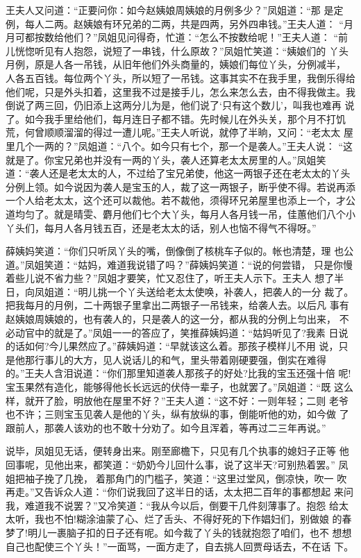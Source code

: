 王夫人又问道：“正要问你：如今赵姨娘周姨娘的月例多少？”凤姐道：“那
是定例，每人二两。赵姨娘有环兄弟的二两，共是四两，另外四串钱。”王夫人道：
“月月可都按数给他们？”凤姐见问得奇，忙道：“怎么不按数给呢！”王夫人道：
“前儿恍惚听见有人抱怨，说短了一串钱，什么原故？”凤姐忙笑道：“姨娘们的
丫头月例，原是人各一吊钱，从旧年他们外头商量的，姨娘们每位丫头，分例减半，
人各五百钱。每位两个丫头，所以短了一吊钱。这事其实不在我手里，我倒乐得给
他们呢，只是外头扣着，这里我不过是接手儿，怎么来怎么去，由不得我做主。我
倒说了两三回，仍旧添上这两分儿为是，他们说了‘只有这个数儿’，叫我也难再
说了。如今我手里给他们，每月连日子都不错。先时候儿在外头关，那个月不打饥
荒，何曾顺顺溜溜的得过一遭儿呢。”王夫人听说，就停了半晌，又问：“老太太
屋里几个一两的？”凤姐道：“八个。如今只有七个，那一个是袭人。”王夫人说：
“这就是了。你宝兄弟也并没有一两的丫头，袭人还算老太太房里的人。”凤姐笑
道：“袭人还是老太太的人，不过给了宝兄弟使，他这一两银子还在老太太的丫头
分例上领。如今说因为袭人是宝玉的人，裁了这一两银子，断乎使不得。若说再添
一个人给老太太，这个还可以裁他。若不裁他，须得环兄弟屋里也添上一个，才公
道均匀了。就是晴雯、麝月他们七个大丫头，每月人各月钱一吊，佳蕙他们八个小
丫头们，每月人各月钱五百，还是老太太的话，别人也恼不得气不得呀。”

薛姨妈笑道：“你们只听凤丫头的嘴，倒像倒了核桃车子似的。帐也清楚，理
也公道。”凤姐笑道：“姑妈，难道我说错了吗？”薛姨妈笑道：“说的何尝错，
只是你慢着些儿说不省力些？”凤姐才要笑，忙又忍住了，听王夫人示下。王夫人
想了半日，向凤姐道：“明儿挑一个丫头送给老太太使唤，补袭人，把袭人的一分
裁了。把我每月的月例，二十两银子里拿出二两银子一吊钱来，给袭人去。以后凡
事有赵姨娘周姨娘的，也有袭人的，只是袭人的这一分，都从我的分例上匀出来，
不必动官中的就是了。”凤姐一一的答应了，笑推薛姨妈道：“姑妈听见了?我素
日说的话如何?今儿果然应了。”薛姨妈道：“早就该这么着。那孩子模样儿不用
说，只是他那行事儿的大方，见人说话儿的和气，里头带着刚硬要强，倒实在难得
的。”王夫人含泪说道：“你们那里知道袭人那孩子的好处?比我的宝玉还强十倍
呢!宝玉果然有造化，能够得他长长远远的伏侍一辈子，也就罢了。”凤姐道：“既
这么样，就开了脸，明放他在屋里不好？”王夫人道：“这不好：一则年轻；二则
老爷也不许；三则宝玉见袭人是他的丫头，纵有放纵的事，倒能听他的劝，如今做
了跟前人，那袭人该劝的也不敢十分劝了。如今且浑着，等再过二三年再说。”

说毕，凤姐见无话，便转身出来。刚至廊檐下，只见有几个执事的媳妇子正等
他回事呢，见他出来，都笑道：“奶奶今儿回什么事，说了这半天?可别热着罢。”
凤姐把袖子挽了几挽，着那角门的门槛子，笑道：“这里过堂风，倒凉快，吹一
吹再走。”又告诉众人道：“你们说我回了这半日的话，太太把二百年的事都想起
来问我，难道我不说罢？”又冷笑道：“我从今以后，倒要干几件刻薄事了。抱怨
给太太听，我也不怕!糊涂油蒙了心、烂了舌头、不得好死的下作娼妇们，别做娘
的春梦了!明儿一裹脑子扣的日子还有呢。如今裁了丫头的钱就抱怨了咱们，也不
想想自己也配使三个丫头！”一面骂，一面方走了，自去挑人回贾母话去，不在话
下。

